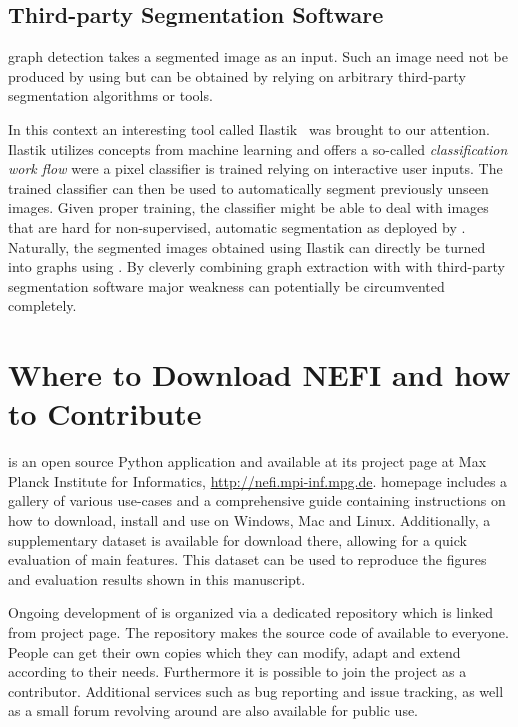 	\subsection{Third-party Segmentation Software}

		\NEFIs graph detection takes a segmented image as an input. Such an image need not be produced by using \NEFI but can be obtained by relying on arbitrary third-party segmentation algorithms or tools. 

		In this context an interesting tool called Ilastik~\cite{sommer2011ilastik} was brought to our attention. Ilastik utilizes concepts from machine learning and offers a so-called \emph{classification work flow} were a pixel classifier is trained relying on interactive user inputs. The trained classifier can then be used to automatically segment previously unseen images. Given proper training, the classifier might be able to deal with images that are hard for non-supervised, automatic segmentation as deployed by \NEFI. Naturally, the segmented images obtained using Ilastik can directly be turned into graphs using \NEFI. By cleverly combining \NEFIs graph extraction with with third-party segmentation software \NEFIs major weakness can potentially be circumvented completely.

\section{Where to Download NEFI and how to Contribute}

	\NEFI is an open source Python application and available at its project page at Max Planck Institute for Informatics, \href{http://nefi.mpi-inf.mpg.de}{http://nefi.mpi-inf.mpg.de}. \NEFIs homepage includes a gallery of various use-cases and a comprehensive guide containing instructions on how to download, install and use \NEFI on Windows, Mac and Linux. Additionally, a supplementary dataset is available for download there, allowing for a quick evaluation of \NEFIs main features. This dataset can be used to reproduce the figures and evaluation results shown in this manuscript. 

	Ongoing development of \NEFI is organized via a dedicated repository which is linked from \NEFIs project page. The repository makes the source code of \NEFI available to everyone. People can get their own copies which they can modify, adapt and extend according to their needs. Furthermore it is possible to join the project as a contributor. Additional services such as bug reporting and issue tracking, as well as a small forum revolving around \NEFI are also available for public use.

